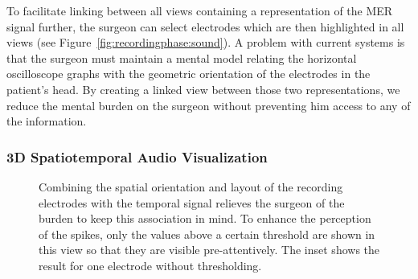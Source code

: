 \documentclass[review]{vgtc}                 %
\begin{document}
To facilitate linking between all views containing a representation of the MER signal further, the surgeon can select electrodes which are then highlighted in all views (see Figure~\ref{fig:recordingphase:sound}). A problem with current systems is that the surgeon must maintain a mental model relating the horizontal oscilloscope graphs with the geometric orientation of the electrodes in the patient's head. By creating a linked view between those two representations, we reduce the mental burden on the surgeon without preventing him access to any of the information.

\subsubsection{3D Spatiotemporal Audio Visualization}\label{sec:overview:recording:3daudio}
\begin{figure}[t]
    \centering
    \caption{Combining the spatial orientation and layout of the recording electrodes with the temporal signal relieves the surgeon of the burden to keep this association in mind. To enhance the perception of the spikes, only the values above a certain threshold are shown in this view so that they are visible pre-attentively. The inset shows the result for one electrode without thresholding.}
    \label{fig:recordingphase:3dsound}
\end{figure}
\end{document}
